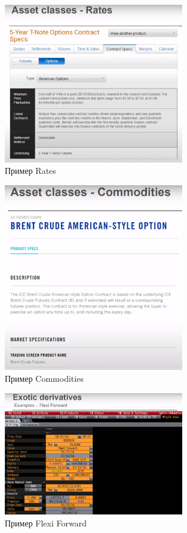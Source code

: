 \documentclass{article}
\begin{document}
\begin{itemize}
\begin{figure}[h]
\centering
\includegraphics[width=0.7\textwidth]{3.png}
\caption{Пример Rates}
\label{loadings}
\end{figure}

\begin{figure}[h]
\centering
\includegraphics[width=0.7\textwidth]{4.png}
\caption{Пример Commodities}
\label{loadings}
\end{figure}

\begin{figure}[h]
\centering
\includegraphics[width=0.7\textwidth]{5.png}
\caption{Пример Flexi Forward}
\label{loadings}
\end{figure}



\end{itemize}
\end{document}
